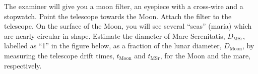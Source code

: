 The examiner will give you a moon filter, an eyepiece with a cross-wire and
a stopwatch. Point the telescope towards the Moon. Attach the filter to the
telescope. On the surface of the Moon, you will see several ``seas'' (maria)
which are nearly circular in shape. Estimate the diameter of Mare
Serenitatis, $D_{\mathrm{MSr}}$, labelled as ``1'' in the figure below, as a
fraction of the lunar diameter, $D_{\mathrm{Moon}}$, by measuring the
telescope drift times, $t_{\mathrm{Moon}}$ and $t_{\mathrm{MSr}}$, for the
Moon and the mare, respectively.

